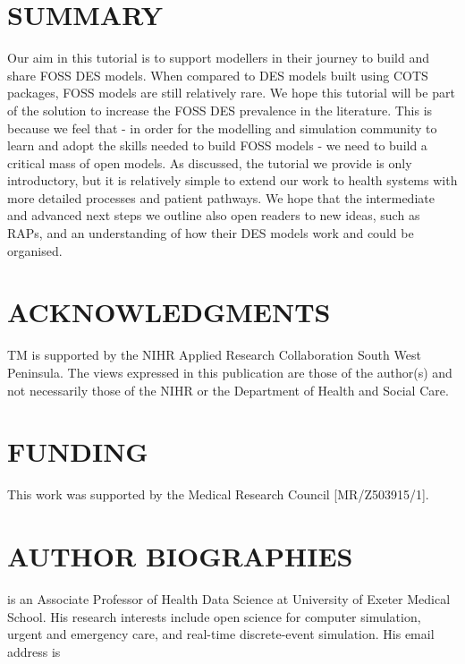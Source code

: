 \documentclass{swpaperproc}
\theoremstyle{sw}
\begin{document}
\section{SUMMARY}

Our aim in this tutorial is to support modellers in their journey to build and share FOSS DES models.  When compared to DES models built using COTS packages, FOSS models are still relatively rare. We hope this tutorial will be part of the solution to increase the FOSS DES prevalence in the literature. This is because we feel that - in order for the modelling and simulation community to learn and adopt the skills needed to build FOSS models - we need to build a critical mass of open models. As discussed, the tutorial we provide is only introductory, but it is relatively simple to extend our work to health systems with more detailed processes and patient pathways.  We hope that the intermediate and advanced next steps we outline also open readers to new ideas, such as RAPs, and an understanding of how their DES models work and could be organised.


\section*{ACKNOWLEDGMENTS}
TM is supported by the NIHR Applied Research Collaboration South West Peninsula. The views expressed in this publication are those of the author(s) and not necessarily those of the NIHR or the Department of Health and Social Care. 

\section*{FUNDING}
This work was supported by the Medical Research Council [MR/Z503915/1]. 




\section*{AUTHOR BIOGRAPHIES}

 is an Associate Professor of Health Data Science at University of Exeter Medical School. His research interests include open science for computer simulation, urgent and emergency care, and real-time discrete-event simulation. His email address is \\
\end{document}
